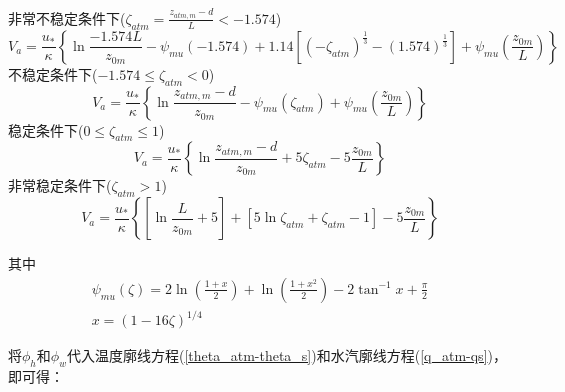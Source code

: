 \noindent 非常不稳定条件下($\zeta_{atm}=\frac{z_{atm,m}-d}{L}<-1.574$)
\begin{equation}\label{Va_VU}
V_{a}=\frac{u_{*}}{\kappa}\left\{\ln \frac{-1.574 L}{z_{0 m}}-\psi_{mu}(-1.574)+
1.14\left[\left(-\zeta_{atm}\right)^{\frac{1}{3}}-(1.574)^{\frac{1}{3}}\right]+\psi_{mu}\left(\frac{z_{0 m}}{L}\right)\right\}
\end{equation}
不稳定条件下($-1.574\le\zeta_{atm}<0$)
\begin{equation}\label{Va_U}
V_{a}=\frac{u_{*}}{\kappa}\left\{\ln \frac{z_{atm, m}-d}{z_{0 m}}-\psi_{mu}\left(\zeta_{atm}\right)+\psi_{mu}\left(\frac{z_{0 m}}{L}\right)\right\}
\end{equation}
稳定条件下($0\le\zeta_{atm}\le1$)
\begin{equation}\label{Va_S}
V_{a}=\frac{u_{*}}{\kappa}\left\{\ln \frac{z_{atm, m}-d}{z_{0 m}}+5 \zeta_{atm}-5 \frac{z_{0 m}}{L}\right\}
\end{equation}
非常稳定条件下($\zeta_{atm}>1$)
\begin{equation}\label{Va_VS}
V_{a}=\frac{u_{*}}{\kappa}\left\{\left[\ln \frac{L}{z_{0 m}}+5\right]+\left[5 \ln \zeta_{atm}+\zeta_{atm}-1\right]-5 \frac{z_{0 m}}{L}\right\}
\end{equation}

\noindent 其中
\begin{equation}\label{Psim}
\begin{array}{c}\psi_{mu}\left(\zeta\right)=2\ln{(\frac{1+x}{2})}+\ln{\left(\frac{1+x^2}{2}\right)-2}\tan^{-1}{x}+\frac{\pi}{2} \\
      x={(1-16\zeta)}^{1/4}\end{array}
\end{equation}

将$\phi_h$和$\phi_w$代入温度廓线方程(\ref{theta_atm-theta_s})和水汽廓线方程(\ref{q_atm-qs})，即可得：

